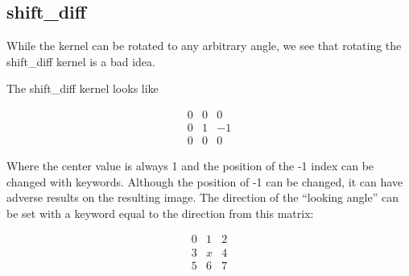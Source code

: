 \documentclass[10pt]{scrartcl}
\begin{document}
    \subsection{shift\_diff} %
    \label{sub:shift_diff}

    While the kernel can be rotated to any arbitrary angle, we see that rotating the shift\_diff kernel is a bad idea. 

    The shift\_diff kernel looks like

    \[ \begin{array}{ccc}
    0   & 0  & 0 \\
    0   &  1 & -1 \\
    0   &  0 & 0 \end{array}\] 

    Where the center value is always 1 and the position of the -1 index can be changed with keywords. Although the position of -1 can be changed, it can have adverse results on the resulting image. The direction of the ``looking angle'' can be set with a keyword equal to the direction from this matrix:

    \[ \begin{array}{ccc}
    0 & 1 & 2 \\
    3 & x & 4 \\
    5 & 6 & 7 \end{array}\] 

    \begin{figure}[!ht]
    \end{figure}
\end{document}
